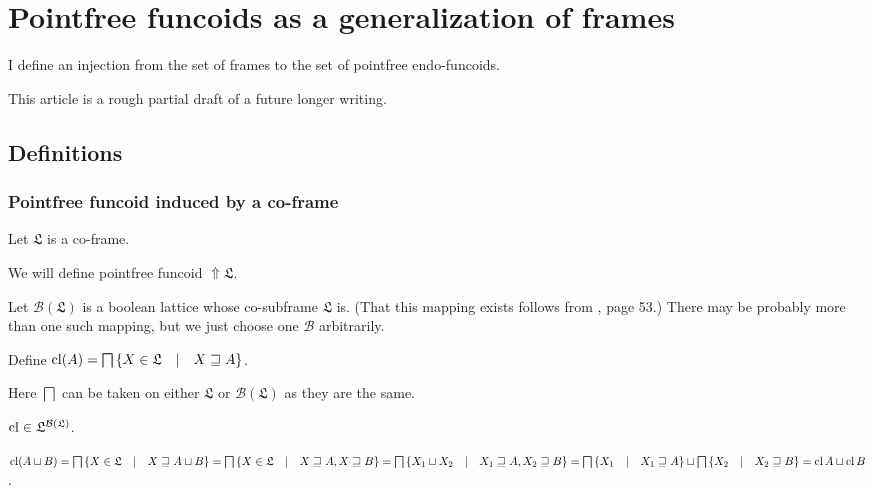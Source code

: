 \chapter{Pointfree funcoids as a generalization of frames}

I define an injection from the set of frames to the set of pointfree endo-funcoids.

This article is a rough partial draft of a future longer writing.

\section{Definitions}

\subsection{Pointfree funcoid induced by a co-frame}

Let $\mathfrak{L}$ is a co-frame.

We will define pointfree funcoid $\Uparrow \mathfrak{L}$.

Let $\mathcal{B} (\mathfrak{L})$ is a boolean lattice whose co-subframe
$\mathfrak{L}$ is. (That this mapping exists follows from
{\cite{stone-spaces}}, page 53.) There may be probably more than one such
mapping, but we just choose one $\mathcal{B}$ arbitrarily.

Define $\operatorname{cl} (A) = \bigsqcap \left\{ X \in \mathfrak{L} \hspace{1em} |
\hspace{1em} X \sqsupseteq A \right\}$.

Here $\bigsqcap$ can be taken on either $\mathfrak{L}$ or $\mathcal{B}
(\mathfrak{L})$ as they are the same.

\begin{obvious}
  $\operatorname{cl} \in \mathfrak{L}^{\mathcal{B} (\mathfrak{L})}$.
\end{obvious}

$\operatorname{cl} (A \sqcup B) = \bigsqcap \left\{ X \in \mathfrak{L} \hspace{1em} |
\hspace{1em} X \sqsupseteq A \sqcup B \right\} = \bigsqcap \left\{ X \in
\mathfrak{L} \hspace{1em} | \hspace{1em} X \sqsupseteq A, X \sqsupseteq B
\right\} = \bigsqcap \left\{ X_1 \sqcup X_2 \hspace{1em} | \hspace{1em} X_1
\sqsupseteq A, X_2 \sqsupseteq B \right\} = \bigsqcap \left\{ X_1 \hspace{1em}
| \hspace{1em} X_1 \sqsupseteq A \right\} \sqcup \bigsqcap \left\{ X_2
\hspace{1em} | \hspace{1em} X_2 \sqsupseteq B \right\} = \operatorname{cl} A \sqcup
\operatorname{cl} B$.

